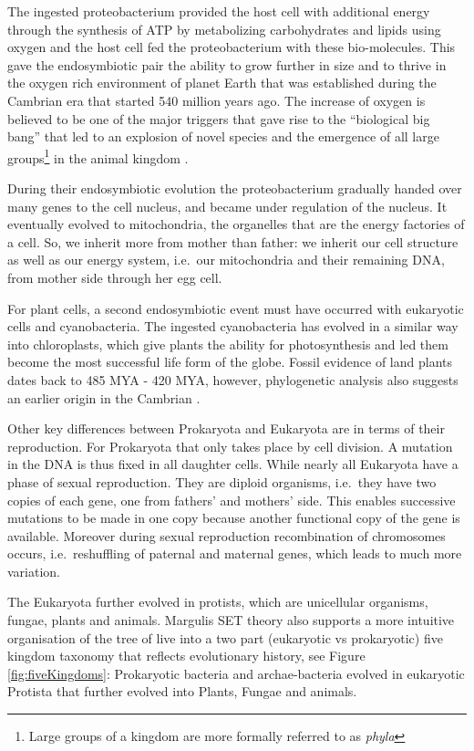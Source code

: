 \documentclass[
  11pt,
]{book}
\begin{document}
The ingested proteobacterium provided the host cell with additional energy through the synthesis of ATP by metabolizing carbohydrates and lipids using oxygen and the host cell fed the proteobacterium with these bio-molecules. This gave the endosymbiotic pair the ability to grow further in size and to thrive in the oxygen rich environment of planet Earth that was established during the Cambrian era that started 540 million years ago. The increase of oxygen is believed to be one of the major triggers that gave rise to the ``biological big bang'' that led to an explosion of novel species and the emergence of all large groups\footnote{Large groups of a kingdom are more formally referred to as \emph{phyla}} in the animal kingdom \citep{he2019}.

During their endosymbiotic evolution the proteobacterium gradually handed over many genes to the cell nucleus, and became under regulation of the nucleus. It eventually evolved to mitochondria, the organelles that are the energy factories of a cell. So, we inherit more from mother than father: we inherit our cell structure as well as our energy system, i.e.~our mitochondria and their remaining DNA, from mother side through her egg cell.

For plant cells, a second endosymbiotic event must have occurred with eukaryotic cells and cyanobacteria. The ingested cyanobacteria has evolved in a similar way into chloroplasts, which give plants the ability for photosynthesis and led them become the most successful life form of the globe. Fossil evidence of land plants dates back to 485 MYA - 420 MYA, however, phylogenetic analysis also suggests an earlier origin in the Cambrian \citep{StrotherFoster2021}.

Other key differences between Prokaryota and Eukaryota are in terms of their reproduction.
For Prokaryota that only takes place by cell division. A mutation in the DNA is thus fixed in all daughter cells. While nearly all Eukaryota have a phase of sexual reproduction. They are diploid organisms, i.e.~they have two copies of each gene, one from fathers' and mothers' side. This enables successive mutations to be made in one copy because another functional copy of the gene is available. Moreover during sexual reproduction recombination of chromosomes occurs, i.e.~reshuffling of paternal and maternal genes, which leads to much more variation.

The Eukaryota further evolved in protists, which are unicellular organisms, fungae, plants and animals.
Margulis SET theory also supports a more intuitive organisation of the tree of live into a two part (eukaryotic vs prokaryotic) five kingdom taxonomy that reflects evolutionary history, see Figure \ref{fig:fiveKingdoms}: Prokaryotic bacteria and archae-bacteria evolved in eukaryotic Protista that further evolved into Plants, Fungae and animals.
\end{document}
